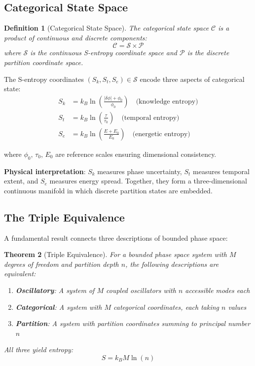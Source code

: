 \documentclass[twocolumn,10pt]{article}
\newtheorem{theorem}{Theorem}[section]
\newtheorem{definition}[theorem]{Definition}
\begin{document}
\subsection{Categorical State Space}

\begin{definition}[Categorical State Space]
The categorical state space $\mathcal{C}$ is a product of continuous and discrete components:
\begin{equation}
    \mathcal{C} = \mathcal{S} \times \mathcal{P}
\end{equation}
where $\mathcal{S}$ is the continuous S-entropy coordinate space and $\mathcal{P}$ is the discrete partition coordinate space.
\end{definition}

The S-entropy coordinates $(S_k, S_t, S_e) \in \mathcal{S}$ encode three aspects of categorical state:
\begin{align}
    S_k &= k_B \ln\left(\frac{|\delta\phi| + \phi_0}{\phi_0}\right) \quad \text{(knowledge entropy)} \\
    S_t &= k_B \ln\left(\frac{\tau}{\tau_0}\right) \quad \text{(temporal entropy)} \\
    S_e &= k_B \ln\left(\frac{E + E_0}{E_0}\right) \quad \text{(energetic entropy)}
\end{align}

where $\phi_0$, $\tau_0$, $E_0$ are reference scales ensuring dimensional consistency.

\textbf{Physical interpretation}: $S_k$ measures phase uncertainty, $S_t$ measures temporal extent, and $S_e$ measures energy spread. Together, they form a three-dimensional continuous manifold in which discrete partition states are embedded.

\subsection{The Triple Equivalence}

A fundamental result connects three descriptions of bounded phase space:

\begin{theorem}[Triple Equivalence]
\label{thm:triple_equivalence}
For a bounded phase space system with $M$ degrees of freedom and partition depth $n$, the following descriptions are equivalent:
\begin{enumerate}
    \item \textbf{Oscillatory}: A system of $M$ coupled oscillators with $n$ accessible modes each
    \item \textbf{Categorical}: A system with $M$ categorical coordinates, each taking $n$ values
    \item \textbf{Partition}: A system with partition coordinates summing to principal number $n$
\end{enumerate}
All three yield entropy:
\begin{equation}
    S = k_B M \ln(n)
    \label{eq:triple_entropy}
\end{equation}
\end{theorem}
\end{document}

